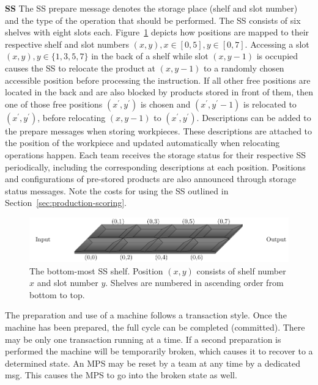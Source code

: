 \documentclass[12pt,twoside]{article}
\newcommand{\refsec}[1]{Section~\ref{#1}}
\newcommand{\reffig}[1]{Figure~\ref{#1}}
\begin{document}
\noindent\textbf{\acl{SS}}
The \ac{SS} prepare message denotes the storage place (shelf and slot number)
and the type of the operation that should be performed.
The \ac{SS} consists of six shelves with eight slots each. \reffig{fig:ss-shelf}
depicts how positions are mapped to their respective shelf and slot numbers
$(x,y),x\in[0,5],y\in[0,7]$.
Accessing a slot $(x,y), y\in\{1,3,5,7\}$ in the back of a shelf while slot
$(x,y-1)$ is occupied causes the \ac{SS} to relocate the product at $(x,y-1)$
to a randomly chosen accessible position before processing the instruction.
If all other free positions are located in the back and
are also blocked by products stored in front of them, then one of those free
positions $(x^\prime,y^\prime)$ is chosen and
$(x^\prime,y^\prime-1)$ is relocated to $(x^\prime,y^\prime)$, before
relocating $(x,y-1)$ to $(x^\prime,y^\prime)$.
Descriptions can be added to the prepare messages when storing workpieces.
These descriptions are attached to the position of the workpiece and updated
automatically when relocating operations happen.
Each team receives the storage status for their respective \ac{SS}
periodically, including the corresponding descriptions at each position.
Positions and configurations of pre-stored products are also announced through
storage status messages.
Note the costs for using the \ac{SS} outlined in
\refsec{sec:production-scoring}.


\begin{figure}[ht]
  \centering
    \includegraphics{figures/storage-shelf.pdf}
    \caption{The bottom-most \ac{SS} shelf. Position $(x,y)$ consists of
      shelf number $x$ and slot number $y$.
    Shelves are numbered in ascending order from bottom to top.}
    \label{fig:ss-shelf}
\end{figure}

\medskip
The preparation and use of a machine follows a transaction style. Once the
machine has been prepared, the full cycle can be completed (committed).
There may be only one transaction running at a time. If a
second preparation is performed the machine will
be temporarily broken, which causes it to recover to a determined state.
An \ac{MPS} may be reset by a team at any time by a dedicated msg.
This causes the \ac{MPS} to go into the broken state as well.
\end{document}
